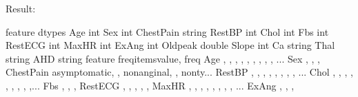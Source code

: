 \documentclass[letterpaper,12pt,english]{sphinxmanual}
\begin{document}
Result:

%
\begin{sphinxVerbatim}[commandchars=\\\{\}]
      feature  dtypes
         Age     int
         Sex     int
   ChestPain  string
      RestBP     int
        Chol     int
         Fbs     int
     RestECG     int
       MaxHR     int
       ExAng     int
     Oldpeak  double
      Slope     int
         Ca  string
       Thal  string
        AHD  string
      feature                            freq\PYGZus{}items\PYG{o}{[}value, freq\PYG{o}{]}
         Age  \PYG{o}{[}\PYG{o}{[}, \PYG{o}{]}, \PYG{o}{[}, \PYG{o}{]}, \PYG{o}{[}, \PYG{o}{]}, \PYG{o}{[}, \PYG{o}{]}, \PYG{o}{[}, ...
         Sex                                \PYG{o}{[}\PYG{o}{[}, \PYG{o}{]}, \PYG{o}{[}, \PYG{o}{]}\PYG{o}{]}
   ChestPain  \PYG{o}{[}\PYG{o}{[}asymptomatic, \PYG{o}{]}, \PYG{o}{[}nonanginal, \PYG{o}{]}, \PYG{o}{[}nonty...
      RestBP  \PYG{o}{[}\PYG{o}{[}, \PYG{o}{]}, \PYG{o}{[}, \PYG{o}{]}, \PYG{o}{[}, \PYG{o}{]}, \PYG{o}{[}, \PYG{o}{]}, \PYG{o}{[}...
        Chol  \PYG{o}{[}\PYG{o}{[}, \PYG{o}{]}, \PYG{o}{[}, \PYG{o}{]}, \PYG{o}{[}, \PYG{o}{]}, \PYG{o}{[}, \PYG{o}{]}, \PYG{o}{[},...
         Fbs                                \PYG{o}{[}\PYG{o}{[}, \PYG{o}{]}, \PYG{o}{[}, \PYG{o}{]}\PYG{o}{]}
     RestECG                       \PYG{o}{[}\PYG{o}{[}, \PYG{o}{]}, \PYG{o}{[}, \PYG{o}{]}, \PYG{o}{[}, \PYG{o}{]}\PYG{o}{]}
       MaxHR  \PYG{o}{[}\PYG{o}{[}, \PYG{o}{]}, \PYG{o}{[}, \PYG{o}{]}, \PYG{o}{[}, \PYG{o}{]}, \PYG{o}{[}, \PYG{o}{]}, \PYG{o}{[}...
       ExAng                                \PYG{o}{[}\PYG{o}{[}, \PYG{o}{]}, \PYG{o}{[}, \PYG{o}{]}\PYG{o}{]}

\end{sphinxVerbatim}
\end{document}
